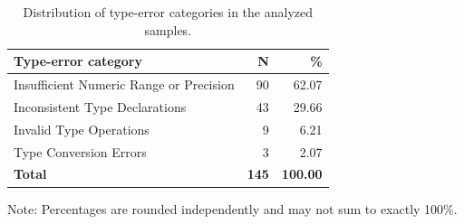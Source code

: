 \begin{table}[t]
\centering
\caption{Distribution of type-error categories in the analyzed samples.}
\label{tab:type_error_categories}
\begin{tabular}{lrr}
\toprule
\textbf{Type-error category} & \textbf{N} & \textbf{\%} \\
\midrule
Insufficient Numeric Range or Precision & 90 & 62.07 \\
Inconsistent Type Declarations          & 43 & 29.66 \\
Invalid Type Operations                 & 9  & 6.21  \\
Type Conversion Errors                  & 3  & 2.07  \\
\midrule
\textbf{Total}                           & \textbf{145} & \textbf{100.00} \\
\bottomrule
\end{tabular}
\par\smallskip
\begin{minipage}{0.95\linewidth}
\footnotesize
Note: Percentages are rounded independently and may not sum to exactly 100\%.
\end{minipage}
\end{table}
